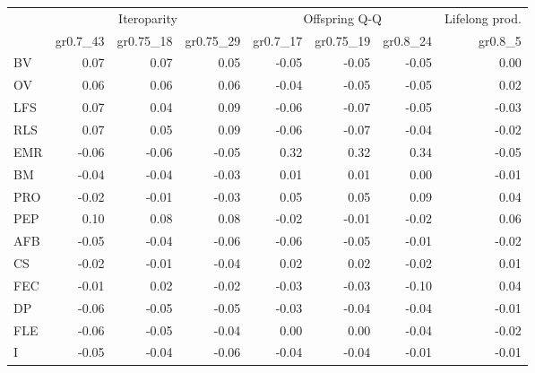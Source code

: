 \begin{landscape}
\begin{table}
\begin{footnotesize}
\begin{tabular}{@{}l|rrr|rrr|r@{}}
\toprule
 & \multicolumn{3}{c|}{Iteroparity} & \multicolumn{3}{c|}{Offspring Q-Q} & \multicolumn{1}{c}{Lifelong prod.}\\
 & gr0.7\_43 & gr0.75\_18 & gr0.75\_29 & gr0.7\_17 & gr0.75\_19 & gr0.8\_24 & gr0.8\_5\\
\midrule
BV & 0.07 & 0.07 & 0.05 & -0.05 & -0.05 & -0.05 & 0.00\\
OV & 0.06 & 0.06 & 0.06 & -0.04 & -0.05 & -0.05 & 0.02\\
LFS & 0.07 & 0.04 & 0.09 & -0.06 & -0.07 & -0.05 & -0.03\\
RLS & 0.07 & 0.05 & 0.09 & -0.06 & -0.07 & -0.04 & -0.02\\
EMR & -0.06 & -0.06 & -0.05 & 0.32 & 0.32 & 0.34 & -0.05\\
BM & -0.04 & -0.04 & -0.03 & 0.01 & 0.01 & 0.00 & -0.01\\
PRO & -0.02 & -0.01 & -0.03 & 0.05 & 0.05 & 0.09 & 0.04\\
PEP & 0.10 & 0.08 & 0.08 & -0.02 & -0.01 & -0.02 & 0.06\\
AFB & -0.05 & -0.04 & -0.06 & -0.06 & -0.05 & -0.01 & -0.02\\
CS & -0.02 & -0.01 & -0.04 & 0.02 & 0.02 & -0.02 & 0.01\\
FEC & -0.01 & 0.02 & -0.02 & -0.03 & -0.03 & -0.10 & 0.04\\
DP & -0.06 & -0.05 & -0.05 & -0.03 & -0.04 & -0.04 & -0.01\\
FLE & -0.06 & -0.05 & -0.04 & 0.00 & 0.00 & -0.04 & -0.02\\
I & -0.05 & -0.04 & -0.06 & -0.04 & -0.04 & -0.01 & -0.01\\
\bottomrule
\end{tabular}
\end{footnotesize}
\end{table}

\end{landscape}


